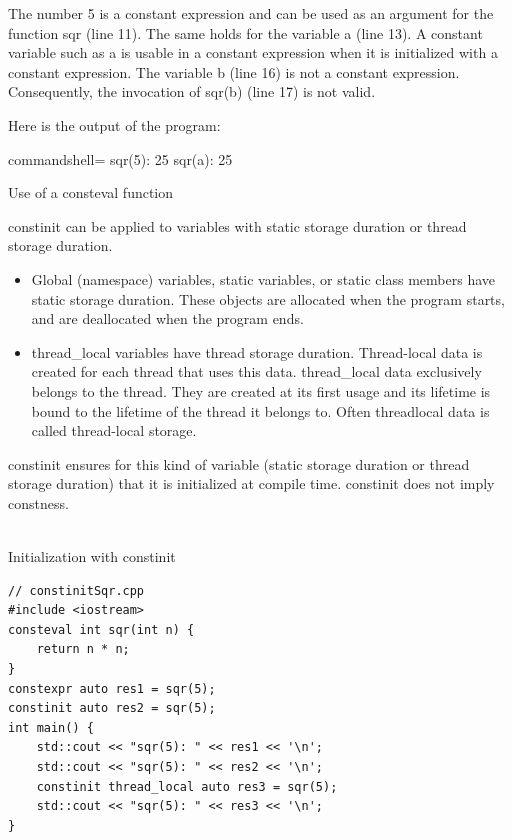 The number 5 is a constant expression and can be used as an argument for the function sqr (line 11). The same holds for the variable a (line 13). A constant variable such as a is usable in a constant expression when it is initialized with a constant expression. The variable b (line 16) is not a constant expression. Consequently, the invocation of sqr(b) (line 17) is not valid.

Here is the output of the program:

\begin{tcblisting}{commandshell={}}
sqr(5): 25
sqr(a): 25
\end{tcblisting}

\begin{center}
Use of a consteval function
\end{center}


constinit can be applied to variables with static storage duration or thread storage duration.

\begin{itemize}
\item 
Global (namespace) variables, static variables, or static class members have static storage duration. These objects are allocated when the program starts, and are deallocated when the program ends.

\item 
thread\_local variables have thread storage duration. Thread-local data is created for each thread that uses this data. thread\_local data exclusively belongs to the thread. They are created at its first usage and its lifetime is bound to the lifetime of the thread it belongs to. Often threadlocal data is called thread-local storage.
\end{itemize}

constinit ensures for this kind of variable (static storage duration or thread storage duration) that it is initialized at compile time. constinit does not imply constness.

\hspace*{\fill} \\ %
\noindent
Initialization with constinit
\begin{lstlisting}[style=styleCXX]
// constinitSqr.cpp
#include <iostream>
consteval int sqr(int n) {
	return n * n;
}
constexpr auto res1 = sqr(5);
constinit auto res2 = sqr(5);
int main() {
	std::cout << "sqr(5): " << res1 << '\n';
	std::cout << "sqr(5): " << res2 << '\n';
	constinit thread_local auto res3 = sqr(5);
	std::cout << "sqr(5): " << res3 << '\n';
}
\end{lstlisting}

